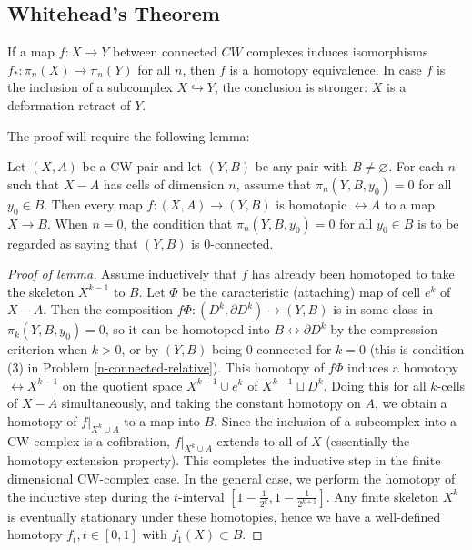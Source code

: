 \subsection{Whitehead's Theorem}

\begin{theorem}\label{Thm:Whitehead}
    If a map $f \colon X \to Y$ between connected
    $CW$ complexes induces isomorphisms
    $f_* \colon \pi_n (X) \to \pi_n (Y)$ for all
    $n$, then $f$ is a homotopy equivalence.
    In case $f$ is the inclusion of a subcomplex
    $X \hookrightarrow Y$, the conclusion is stronger:
    $X$ is a deformation retract of $Y$.
\end{theorem}

The proof will require the following lemma:

\begin{lemma}
    Let $\left( X,A \right) $ be a CW pair and let
    $\left( Y, B \right) $ be any pair with
    $B \neq \varnothing$. For each  $n$ such that
    $X - A$ has cells of dimension $n$, assume
    that  $\pi_n \left( Y, B, y_0 \right) = 0$ for
    all $y_0 \in B$. Then every map $f \colon
    \left( X,A \right) \to \left( Y,B \right) $ is homotopic
    $\rel A$ to a map $X \to B$.
    When $n = 0$, the condition that
    $\pi_n \left( Y,B,y_0 \right) =0$ for all
    $y_0 \in B$ is to be regarded as saying that
    $\left( Y,B \right) $ is $0$-connected.
\end{lemma}

\begin{proof}[Proof of lemma]
    Assume inductively that $f$ has already been
    homotoped to take the skeleton
    $X^{k-1}$ to $B$. Let
    $\Phi$ be the caracteristic (attaching) map of 
    cell $e^{k}$ of $X - A$. Then the composition
    $f \Phi \colon \left( D^{k} , \partial D^{k} \right) 
    \to \left( Y,B \right) $ is in some class
    in $\pi_k \left( Y, B, y_0 \right) = 0$, so
    it can be homotoped into $B \rel \partial D^{k}$ by
    the compression criterion when
    $k > 0$, or
    by $\left( Y,B \right) $ being $0$-connected for
    $k = 0$ (this is condition (3) in Problem \ref{n-connected-relative}).
    This homotopy of $f \Phi$ induces a homotopy
    $\rel X^{k-1}$ on the quotient space
    $X^{k-1} \cup e^{k}$ of $X^{k-1} \sqcup D^{k}$.
    Doing this for all $k$-cells of $X-A$ simultaneously, and
    taking the constant homotopy on $A$, we obtain a
    homotopy of $f|_{X^{k} \cup A}$ to a map into
    $B$. Since the inclusion of a
    subcomplex into a CW-complex is a cofibration,
    $f|_{X^{k} \cup  A}$ extends to all of $X$ (essentially
    the homotopy extension property).
    This completes the inductive step in the finite dimensional
    CW-complex case.
    In the general case, we perform the
    homotopy of the inductive step during the
    $t$-interval $\left[ 1- \frac{1}{2^{k}},
    1- \frac{1}{2^{k+1}}\right] $. Any finite skeleton
    $X^{k}$ is eventually stationary under these
    homotopies, hence we have a well-defined
    homotopy $f_t, t \in \left[ 0,1 \right] $ with
    $f_1 (X) \subset B$.
\end{proof}


